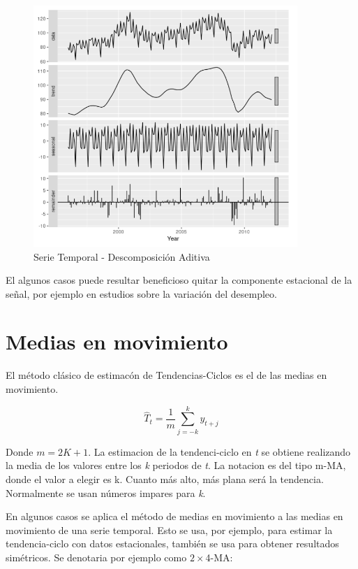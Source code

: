 \documentclass{article}
\begin{document}
	\begin{figure}[h]
		\centering
                \label{fig_2}
                \includegraphics[width=10cm]{Ejemplo_ST_descomposicion}
		\caption{Serie Temporal - Descomposición Aditiva}
	\end{figure} 
        El algunos casos puede resultar beneficioso quitar la componente estacional de la señal, por ejemplo en estudios sobre la variación del desempleo.


        \section{Medias en movimiento}

        El método clásico de estimacón de Tendencias-Ciclos es el de las medias en movimiento.
        
        \begin{equation}
                \label{eq_1}
                \hat{T}_{t} = \frac{1}{m}\displaystyle\sum_{j=-k}^{k}y_{t+j}
        \end{equation}

        Donde $m = 2K +1$. La estimacion de la tendenci-ciclo en \textit{t} se obtiene realizando la media de los valores entre los \textit{k} periodos de \textit{t}. La notacion es del tipo m-MA, donde el valor a elegir es k. Cuanto más alto, más plana será la tendencia. Normalmente se usan números impares para \textit{k}.
        \newpage

        En algunos casos se aplica el método de medias en movimiento a las medias en movimiento de una serie temporal. Esto se usa, por ejemplo, para estimar la tendencia-ciclo con datos estacionales, también se usa para obtener resultados simétricos. Se denotaria por ejemplo como $2 \times $4-MA:
\end{document}
